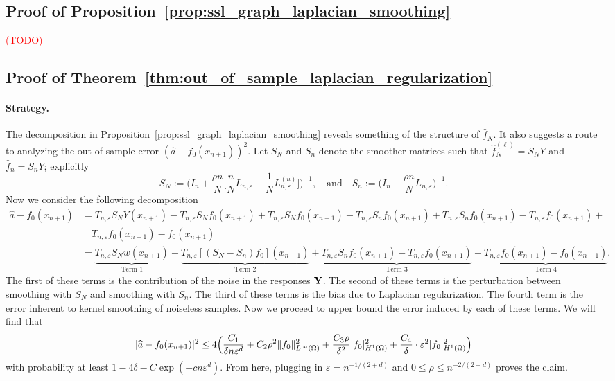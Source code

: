 \documentclass{article}
\newcommand{\1}{\mathbf{1}}
\newcommand{\wh}[1]{\widehat{#1}}
\theoremstyle{alden}
\theoremstyle{aldenthm}
\theoremstyle{definition}
\theoremstyle{remark}
\begin{document}
\subsection{Proof of Proposition~\ref{prop:ssl_graph_laplacian_smoothing}}
\label{subsec:pf_ssl_graph_laplacian_smoothing}
\textcolor{red}{(TODO)}

\subsection{Proof of Theorem~\ref{thm:out_of_sample_laplacian_regularization}}
\label{subsec:pf_ssl_graph_laplacian_smoothing_2}

\paragraph{Strategy.}
The decomposition in Proposition~\ref{prop:ssl_graph_laplacian_smoothing} reveals something of the structure of $\wh{f}_N$. It also suggests a route to analyzing the out-of-sample error $(\wh{a} - f_0(x_{n + 1}))^2$. Let $S_N$ and $S_n$ denote the smoother matrices such that $\wh{f}_N^{(\ell)} = S_NY$ and $\wh{f}_n = S_nY$; explicitly
\begin{equation*}
S_N := \Biggl(I_n + \frac{\rho n}{N}\biggl[\frac{n}{N}L_{n,\varepsilon} + \frac{1}{N}L_{n,\varepsilon}^{(u)}\biggr]\Biggr)^{-1}, \quad \textrm{and} \quad S_n := \Biggl(I_n + \frac{\rho n}{N}L_{n,\varepsilon}\Biggr)^{-1}.
\end{equation*}
Now we consider the following decomposition
\begin{align*}
\wh{a} - f_0(x_{n + 1}) & = T_{n,\varepsilon}S_NY(x_{n + 1}) - T_{n,\varepsilon}S_Nf_0(x_{n + 1}) + T_{n,\varepsilon}S_Nf_0(x_{n + 1}) - T_{n,\varepsilon}S_nf_0(x_{n + 1}) + T_{n,\varepsilon}S_nf_0(x_{n + 1}) - T_{n,\varepsilon}f_0(x_{n + 1}) + \\
& \quad T_{n,\varepsilon}f_0(x_{n + 1}) - f_0(x_{n + 1}) \\
& =  \underbrace{T_{n,\varepsilon}S_Nw(x_{n + 1})}_{\textrm{Term 1}} + \underbrace{T_{n,\varepsilon}[(S_N - S_n)f_0](x_{n + 1})}_{\textrm{Term 2}} +  \underbrace{T_{n,\varepsilon}S_nf_0(x_{n + 1}) - T_{n,\varepsilon}f_0(x_{n + 1})}_{\textrm{Term 3}} + \underbrace{T_{n,\varepsilon}f_0(x_{n + 1}) - f_0(x_{n + 1})}_{\textrm{Term 4}}.
\end{align*}
The first of these terms is the contribution of the noise in the responses ${\bf Y}$. The second of these terms is the perturbation between smoothing with $S_N$ and smoothing with $S_n$. The third of these terms is the bias due to Laplacian regularization. The fourth term is the error inherent to kernel smoothing of noiseless samples. Now we proceed to upper bound the error induced by each of these terms. We will find that
\begin{equation*}
|\wh{a} - f_0(x_{n + 1})|^2 \leq 4\Bigl(\frac{C_1}{\delta n\varepsilon^d} + C_2\rho^2\|f_0\|_{L^{\infty}(\Omega)}^2 + \frac{C_3\rho}{\delta^2}|f_0|_{H^1(\Omega)}^2 + \frac{C_4}{\delta} \cdot \varepsilon^2 |f_0|_{H^1(\Omega)}^2\Bigr)
\end{equation*}
with probability at least $1 - 4\delta - C\exp(-cn\varepsilon^d)$. From here, plugging in $\varepsilon = n^{-1/(2 + d)}$ and $0 \leq \rho \leq n^{-2/(2 + d)}$ proves the claim.
\end{document}
